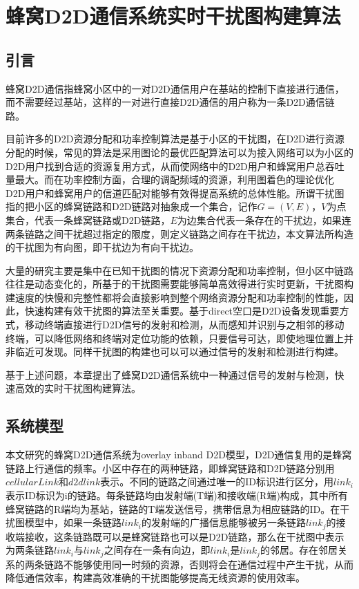 \documentclass[figurelist,tablelist,algorithmlist,nomlist,masters]{seuthesix}
\begin{document}
	\chapter{蜂窝D2D通信系统实时干扰图构建算法}
	\section{引言}
	蜂窝D2D通信指蜂窝小区中的一对D2D通信用户在基站的控制下直接进行通信，而不需要经过基站，这样的一对进行直接D2D通信的用户称为一条D2D通信链路。

	目前许多的D2D资源分配和功率控制算法是基于小区的干扰图，在D2D进行资源分配的时候，常见的算法是采用图论的最优匹配算法可以为接入网络可以为小区的D2D用户找到合适的资源复用方式，从而使网络中的D2D用户和蜂窝用户总吞吐量最大。而在功率控制方面，合理的调配频域的资源，利用图着色的理论优化D2D用户和蜂窝用户的信道匹配对能够有效得提高系统的总体性能。所谓干扰图指的把小区的蜂窝链路和D2D链路对抽象成一个集合，记作$G=(V,E)$，$V$为点集合，代表一条蜂窝链路或D2D链路，$E$为边集合代表一条存在的干扰边，如果连两条链路之间干扰超过指定的限度，则定义链路之间存在干扰边，本文算法所构造的干扰图为有向图，即干扰边为有向干扰边。

	大量的研究主要是集中在已知干扰图的情况下资源分配和功率控制，但小区中链路往往是动态变化的，所基于的干扰图需要能够简单高效得进行实时更新，干扰图构建速度的快慢和完整性都将会直接影响到整个网络资源分配和功率控制的性能，因此，快速构建有效干扰图的算法至关重要。基于direct空口是D2D设备发现重要方式，移动终端直接进行D2D信号的发射和检测，从而感知并识别与之相邻的移动终端，可以降低网络和终端对定位功能的依赖，只要信号可达，即使地理位置上并非临近可发现。同样干扰图的构建也可以可以通过信号的发射和检测进行构建。

	基于上述问题，本章提出了蜂窝D2D通信系统中一种通过信号的发射与检测，快速高效的实时干扰图构建算法。
	
	\section{系统模型}
	本文研究的蜂窝D2D通信系统为overlay inband D2D模型，D2D通信复用的是蜂窝链路上行通信的频率。小区中存在的两种链路，即蜂窝链路和D2D链路分别用$cellularLink$和$d2dlink$表示。不同的链路之间通过唯一的ID标识进行区分，用$link_i$表示ID标识为i的链路。每条链路均由发射端(T端)和接收端(R端)构成，其中所有蜂窝链路的R端均为基站，链路的T端发送信号，携带信息为相应链路的ID。在干扰图模型中，如果一条链路$link_i$的发射端的广播信息能够被另一条链路$link_j$的接收端接收，这条链路既可以是蜂窝链路也可以是D2D链路，那么在干扰图中表示为两条链路$link_i$与$link_j$之间存在一条有向边，即$link_i$是$link_j$的邻居。存在邻居关系的两条链路不能够使用同一时频的资源，否则将会在通信过程中产生干扰，从而降低通信效率，构建高效准确的干扰图能够提高无线资源的使用效率。
\end{document}
